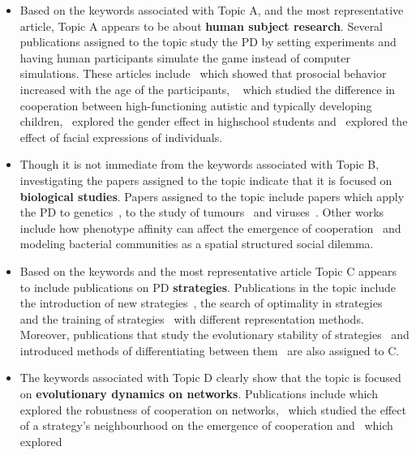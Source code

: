 \documentclass{article}
\theoremstyle{definition}
\begin{document}
\begin{itemize}
    \item Based on the keywords associated with Topic A, and the most
    representative article, Topic A appears to be about \textbf{human subject
    research}. Several publications assigned to the topic study the PD by
    setting experiments and having human participants simulate the game
    instead of computer simulations. These articles include~\cite{Matsumoto2016}
    which showed that prosocial behavior increased with the age of the
    participants, ~\cite{Li2014} which studied the difference in cooperation
    between high-functioning autistic and typically developing
    children,~\cite{Molina2013} explored the gender effect in highschool
    students and~\cite{Bell2017} explored the effect of facial expressions of
    individuals.
    \item Though it is not immediate from the keywords associated with
    Topic B, investigating the papers assigned to the topic indicate that it
    is focused on \textbf{biological studies}. Papers assigned to the topic include
    papers which apply the PD to genetics~\cite{Santorelli2008, Sistrom2015}, to
    the study of tumours~\cite{archetti2013evolutionary, sartakhti2017} and
    viruses~\cite{turner1999prisoner}. Other works include how phenotype affinity
    can affect the emergence of cooperation~\cite{wu2019phenotype} and modeling
    bacterial communities as a spatial structured social dilemma.
    \item Based on the keywords and the most representative article Topic
    C appears to include publications on PD \textbf{strategies}. Publications
    in the topic include the introduction of new strategies~\cite{stewart2013extortion},
    the search of optimality in strategies~\cite{banerjee2007reaching} and the
    training of strategies~\cite{ishibuchi2011evolution} with different
    representation methods. Moreover, publications that study the evolutionary
    stability of strategies~\cite{adami2013evolutionary} and introduced methods
    of differentiating between them~\cite{ashlock2008fingerprinting} are
    also assigned to C.
    \item The keywords associated with Topic D clearly show that the topic
    is focused on \textbf{evolutionary dynamics on networks}. Publications include
    \cite{ichinose2013robustness} which explored the robustness of cooperation
    on networks,~\cite{wang2012spatial} which studied the effect of a strategy's neighbourhood
    on the emergence of cooperation and~\cite{chen2016fixation} which explored

\end{itemize}
\end{document}
